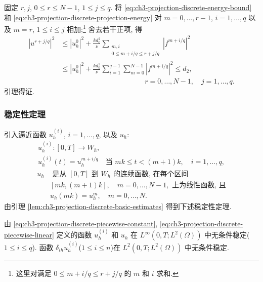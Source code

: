 \begin{Proof}
\hypertarget{chapter-03-page-296}{}
固定 $r,j$, $0\leq r\leq N-1$, $1\leq j\leq q$. 将 \eqref{eq:ch3-projection-discrete-energy-bound} 和 \eqref{eq:ch3-projection-discrete-projection-energy} 对 $m=0,\ldots,r-1$, $i=1,\ldots,q$ 以及 $m=r$, $1\leq i\leq j$ 相加;\footnote{这里对满足 $0\leq m+i/q\leq r+j/q$ 的 $m$ 和 $i$ 求和.} 舍去若干正项, 得
\[
\begin{aligned}
|u^{r+j/q}|^2
&\leq|u_h^0|^2+\frac{kd_0^2}{\nu}
\sum_{\substack{m,i\\0\leq m+i/q\leq r+j/q}}|f^{m+i/q}|^2\\
&\leq|u_h^0|^2+\frac{kd_0^2}{\nu}
\sum_{i=1}^{q-1}\sum_{m=0}^{N-1}|f^{m+i/q}|^2
\leq d_2,\\
&\hspace{5cm}r=0,\ldots,N-1,\quad j=1,\ldots,q.
\end{aligned}
\]
引理得证.
\end{Proof}

\subsubsection{稳定性定理}
\label{subsubsec:ch3-projection-stability-theorem}

引入逼近函数 $u_h^{(i)}$, $i=1,\ldots,q$, 以及 $u_h$:
\begin{equation}
\begin{gathered}
u_h^{(i)}:[0,T]\longrightarrow W_h,\\
u_h^{(i)}(t)=u_h^{m+i/q}
\quad\text{当 }mk\leq t<(m+1)k,\quad i=1,\ldots,q,
\end{gathered}
\label{eq:ch3-projection-discrete-piecewise-constant}
\end{equation}
\begin{equation}
\begin{aligned}
u_h&\text{ 是从 }[0,T]\text{ 到 }W_h\text{ 的连续函数, 在每个区间}\\
&[mk,(m+1)k],\quad m=0,\ldots,N-1,\text{ 上为线性函数, 且}\\
&u_h(mk)=u_h^m,\quad m=0,\ldots,N.
\end{aligned}
\label{eq:ch3-projection-discrete-piecewise-linear}
\end{equation}
由引理 \ref{lem:ch3-projection-discrete-basic-estimates} 得到下述稳定性定理.

\begin{Theorem}
\label{thm:ch3-projection-unconditional-stability}
由 \eqref{eq:ch3-projection-discrete-piecewise-constant}, \eqref{eq:ch3-projection-discrete-piecewise-linear} 定义的函数 $u_h^{(i)}$ 和 $u_h$ 在 $L^\infty(0,T;L^2(\Omega))$ 中无条件稳定($1\leq i\leq q$). 函数 $\delta_{ih}u_h^{(i)}$($1\leq i\leq n$)在 $L^2(0,T;L^2(\Omega))$ 中无条件稳定.
\end{Theorem}

